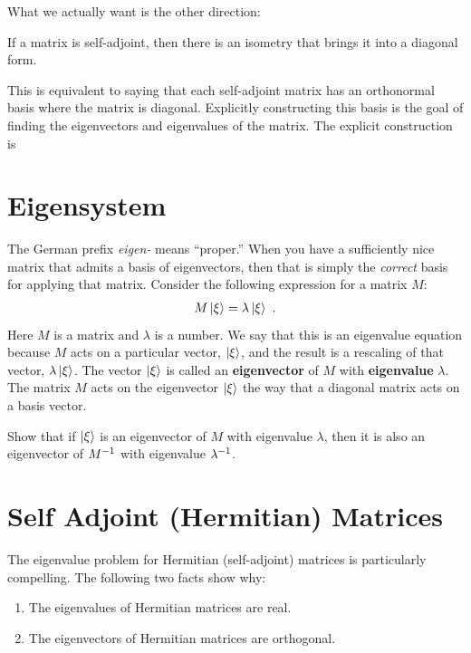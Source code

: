 \documentclass[12pt, oneside]{report}    %
\let\oldsection\section
\def\section{%
  \setcounter{sidenote}{1}%
  \oldsection
}
\begin{document}
What we actually want is the other direction:
\begin{theorem}
If a matrix is self-adjoint, then there is an isometry that brings it into a diagonal form. 
\end{theorem}
This is equivalent to saying that each self-adjoint matrix has an orthonormal basis where the matrix is diagonal. Explicitly constructing this basis is the goal of finding the eigenvectors and eigenvalues of the matrix. The explicit construction is

\section{Eigensystem}
\label{sec:eigensystem}

The German prefix \emph{eigen-} means ``proper.'' When you have a sufficiently nice matrix that admits a basis of eigenvectors, then that is simply the \emph{correct} basis for applying that matrix. Consider the following expression for a matrix $M$:
\begin{align}
    M\left|\xi\right\rangle = \lambda\left|\xi\right\rangle \ .
\end{align}
Here $M$ is a matrix and $\lambda$ is a number. We say that this is an eigenvalue equation because $M$ acts on a particular vector, $\left|\xi\right\rangle$, and the result is a rescaling of that vector, $\lambda\left|\xi\right\rangle$. The vector $\left|\xi\right\rangle$ is called an \textbf{eigenvector} of $M$ with \textbf{eigenvalue} $\lambda$.  The matrix $M$ acts on the eigenvector $\left|\xi\right\rangle$ the way that a diagonal matrix acts on a basis vector.
 
\begin{exercise}
Show that if $\left|\xi\right\rangle$ is an eigenvector of $M$ with eigenvalue $\lambda$, then it is also an eigenvector of $M^{-1}$ with eigenvalue $\lambda^{-1}$. 
\end{exercise}

\section{Self Adjoint (Hermitian) Matrices}

The eigenvalue problem for Hermitian (self-adjoint) matrices is particularly compelling. The following two facts show why:
\begin{enumerate}
    \item The eigenvalues of Hermitian matrices are real.
    \item The eigenvectors of Hermitian matrices are orthogonal.
\end{enumerate}
\end{document}
